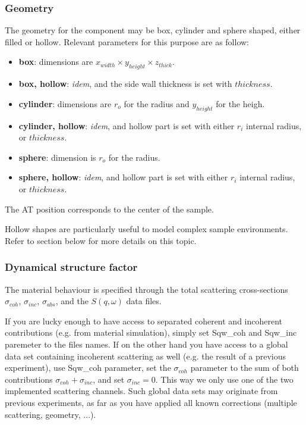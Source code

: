 \subsubsection{Geometry}

The geometry for the component may be box, cylinder and sphere shaped, either filled or hollow. Relevant parameters for this purpose are as follow:
\begin{itemize}
\item {\bf box}: dimensions are $x_{width} \times y_{height} \times z_{thick}$.
\item {\bf box, hollow}: \emph{idem}, and the side wall thickness is set with $thickness$.
\item {\bf cylinder}: dimensions are $r_o$ for the radius and $y_{height}$ for the heigh.
\item {\bf cylinder, hollow}: \emph{idem}, and hollow part is set with either $r_i$ internal radius, or $thickness$.
\item {\bf sphere}: dimension is $r_o$ for the radius.
\item {\bf sphere, hollow}: \emph{idem}, and hollow part is set with either $r_i$ internal radius, or $thickness$.
\end{itemize}
The AT position corresponds to the center of the sample.

Hollow shapes are particularly useful to model complex sample environments. Refer to section below for more details on this topic.

\subsubsection{Dynamical structure factor}

The material behaviour is specified through the total scattering cross-sections $\sigma_{coh}$, $\sigma_{inc}$, $\sigma_{abs}$, and the $S(q, \omega)$ data files.

If you are lucky enough to have access to separated coherent and incoherent contributions (e.g. from material simulation), simply set Sqw\_coh and Sqw\_inc paremeter to the files names. If on the other hand you have access to a global data set containing incoherent scattering as well (e.g. the result of a previous experiment), use Sqw\_coh parameter, set the $\sigma_{coh}$ parameter to the sum of both contributions $\sigma_{coh}+\sigma_{inc}$, and set $\sigma_{inc}=0$. This way we only use one of the two implemented  scattering channels. Such global data sets may originate from previous experiments, as far as you have applied all known corrections (multiple scattering, geometry, ...).

